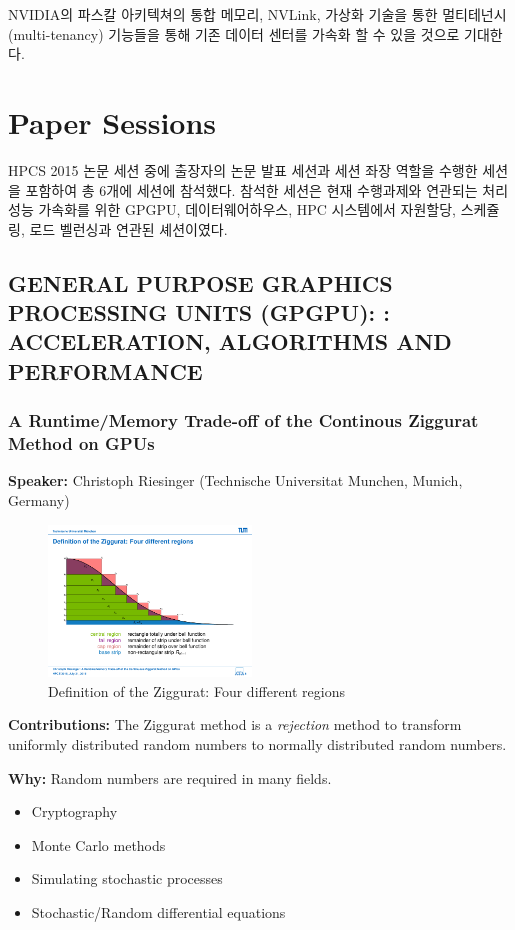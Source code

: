 \documentclass[twocolumn]{article}
\newcommand{\bi}{\begin{itemize}}
\newcommand{\ei}{\end{itemize}}
\newcommand{\ii}{\item}
\begin{document}
NVIDIA의 파스칼 아키텍쳐의 통합 메모리, NVLink, 가상화 기술을 통한 멀티테넌시 (multi-tenancy) 기능들을 통해 기존 데이터 센터를 가속화 할 수 있을 것으로 기대한다. 

\section{Paper Sessions}
HPCS 2015 논문 세션 중에 출장자의 논문 발표 세션과 세션 좌장 역할을 수행한 세션을 포함하여 총 6개에 세션에 참석했다. 참석한 세션은 현재 수행과제와 연관되는 처리성능 가속화를 위한 GPGPU, 데이터웨어하우스, HPC 시스템에서 자원할당,  스케쥴링, 로드 벨런싱과 연관된 셰션이였다.

\subsection{GENERAL PURPOSE GRAPHICS PROCESSING UNITS (GPGPU): : ACCELERATION, ALGORITHMS AND PERFORMANCE}

\subsubsection{A Runtime/Memory Trade-off of the Continous Ziggurat Method on GPUs}
\textbf{Speaker:} Christoph Riesinger (Technische Universitat Munchen, Munich, Germany)

\begin{figure}[htb]
        \centering
        \includegraphics[width=0.48\textwidth]{ziggurat.pdf}
        \caption{Definition of the Ziggurat: Four different regions}
        \label{fig:ziggurat}
\end{figure}

\noindent
\textbf{Contributions:} The Ziggurat method is a \textit{rejection} method to transform uniformly distributed random numbers to normally distributed random numbers.

\noindent
\textbf{Why:}  Random numbers are required in many fields.
\bi
\ii Cryptography
\ii Monte Carlo methods
\ii Simulating stochastic processes
\ii Stochastic/Random differential equations
\ei
\end{document}
